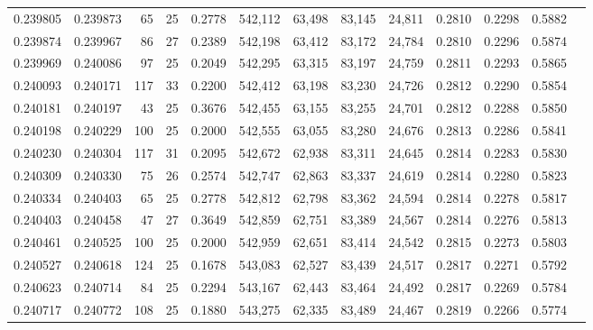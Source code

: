 \begin{tabular}{rrrrrrrrrrrrr}
0.239805 & 0.239873 &  65 &  25 &                                     0.2778 & 542,112 &  63,498 &  83,145 &  24,811 & 0.2810 & 0.2298 & 0.5882 \\
0.239874 & 0.239967 &  86 &  27 &                                     0.2389 & 542,198 &  63,412 &  83,172 &  24,784 & 0.2810 & 0.2296 & 0.5874 \\
0.239969 & 0.240086 &  97 &  25 &                                     0.2049 & 542,295 &  63,315 &  83,197 &  24,759 & 0.2811 & 0.2293 & 0.5865 \\
0.240093 & 0.240171 & 117 &  33 &                                     0.2200 & 542,412 &  63,198 &  83,230 &  24,726 & 0.2812 & 0.2290 & 0.5854 \\
0.240181 & 0.240197 &  43 &  25 &                                     0.3676 & 542,455 &  63,155 &  83,255 &  24,701 & 0.2812 & 0.2288 & 0.5850 \\
0.240198 & 0.240229 & 100 &  25 &                                     0.2000 & 542,555 &  63,055 &  83,280 &  24,676 & 0.2813 & 0.2286 & 0.5841 \\
0.240230 & 0.240304 & 117 &  31 &                                     0.2095 & 542,672 &  62,938 &  83,311 &  24,645 & 0.2814 & 0.2283 & 0.5830 \\
0.240309 & 0.240330 &  75 &  26 &                                     0.2574 & 542,747 &  62,863 &  83,337 &  24,619 & 0.2814 & 0.2280 & 0.5823 \\
0.240334 & 0.240403 &  65 &  25 &                                     0.2778 & 542,812 &  62,798 &  83,362 &  24,594 & 0.2814 & 0.2278 & 0.5817 \\
0.240403 & 0.240458 &  47 &  27 &                                     0.3649 & 542,859 &  62,751 &  83,389 &  24,567 & 0.2814 & 0.2276 & 0.5813 \\
0.240461 & 0.240525 & 100 &  25 &                                     0.2000 & 542,959 &  62,651 &  83,414 &  24,542 & 0.2815 & 0.2273 & 0.5803 \\
0.240527 & 0.240618 & 124 &  25 &                                     0.1678 & 543,083 &  62,527 &  83,439 &  24,517 & 0.2817 & 0.2271 & 0.5792 \\
0.240623 & 0.240714 &  84 &  25 &                                     0.2294 & 543,167 &  62,443 &  83,464 &  24,492 & 0.2817 & 0.2269 & 0.5784 \\
0.240717 & 0.240772 & 108 &  25 &                                     0.1880 & 543,275 &  62,335 &  83,489 &  24,467 & 0.2819 & 0.2266 & 0.5774 \\

\end{tabular}
